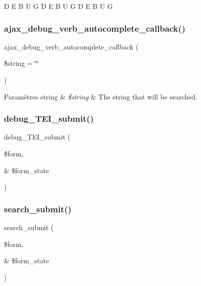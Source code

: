 D E B U G D E B U G D E B U G \hypertarget{conjoc__debug__web_form_8inc_aedd67c4b770b58826708010ce4ef7ac7}{}\label{conjoc__debug__web_form_8inc_aedd67c4b770b58826708010ce4ef7ac7} 
\subsubsection{\texorpdfstring{ajax\+\_\+debug\+\_\+verb\+\_\+autocomplete\+\_\+callback()}{ajax\_debug\_verb\_autocomplete\_callback()}}
{\footnotesize\ttfamily ajax\+\_\+debug\+\_\+verb\+\_\+autocomplete\+\_\+callback (\begin{DoxyParamCaption}\item[{}]{\$string = {\ttfamily \char`\"{}\char`\"{}} }\end{DoxyParamCaption})}


\begin{DoxyParams}[1]{Paramètres}
string & {\em \$string} & The string that will be searched. \\
\hline
\end{DoxyParams}
\hypertarget{conjoc__debug__web_form_8inc_af6a94ce95f29fca17e5a3fb82855e835}{}\label{conjoc__debug__web_form_8inc_af6a94ce95f29fca17e5a3fb82855e835} 
\subsubsection{\texorpdfstring{debug\+\_\+\+T\+E\+I\+\_\+submit()}{debug\_TEI\_submit()}}
{\footnotesize\ttfamily debug\+\_\+\+T\+E\+I\+\_\+submit (\begin{DoxyParamCaption}\item[{}]{\$form,  }\item[{\&}]{\$form\+\_\+state }\end{DoxyParamCaption})}

\hypertarget{conjoc__debug__web_form_8inc_a11d1063e5c7b2bf2e290639c78266d71}{}\label{conjoc__debug__web_form_8inc_a11d1063e5c7b2bf2e290639c78266d71} 
\subsubsection{\texorpdfstring{search\+\_\+submit()}{search\_submit()}}
{\footnotesize\ttfamily search\+\_\+submit (\begin{DoxyParamCaption}\item[{}]{\$form,  }\item[{\&}]{\$form\+\_\+state }\end{DoxyParamCaption})}

